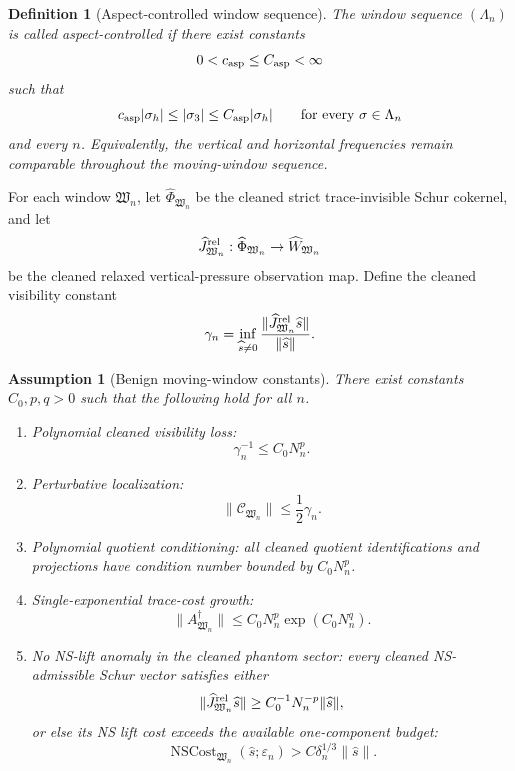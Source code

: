 \documentclass[11pt]{article}
\numberwithin{equation}{section}
\newtheorem{definition}[theorem]{Definition}
\newtheorem{assumption}[theorem]{Assumption}
\newcommand{\eps}{\varepsilon}
\begin{document}
\begin{definition}[Aspect-controlled window sequence]\label{def:aspect-controlled-window-sequence}
The window sequence \((\Lambda_n)\) is called aspect-controlled if there exist constants
\[
        0<c_{\rm asp}\le C_{\rm asp}<\infty
\]
such that
\[
        c_{\rm asp}|\sigma_h|
        \le
        |\sigma_3|
        \le
        C_{\rm asp}|\sigma_h|
        \qquad
        \text{for every }\sigma\in\Lambda_n
\]
and every \(n\).  Equivalently, the vertical and horizontal frequencies remain comparable throughout the moving-window sequence.
\end{definition}

For each window \(\mathfrak W_n\), let \(\widehat\Phi_{\mathfrak W_n}\) be the cleaned strict trace-invisible Schur cokernel, and let
\[
        \widehat J_{\mathfrak W_n}^{\rm rel}:
        \widehat\Phi_{\mathfrak W_n}\to \widehat W_{\mathfrak W_n}
\]
be the cleaned relaxed vertical-pressure observation map.  Define the cleaned visibility constant
\[
        \gamma_n
        =
        \inf_{\widehat s\neq0}
        \frac{\|\widehat J_{\mathfrak W_n}^{\rm rel}\widehat s\|}
        {\|\widehat s\|}.
\]

\begin{assumption}[Benign moving-window constants]\label{ass:benign-moving-window-constants}
There exist constants \(C_0,p,q>0\) such that the following hold for all \(n\).
\begin{enumerate}
\item \emph{Polynomial cleaned visibility loss:}
\[
        \gamma_n^{-1}\le C_0N_n^p.
\]
\item \emph{Perturbative localization:}
\[
        \|\mathcal C_{\mathfrak W_n}\|\le \frac12\gamma_n.
\]
\item \emph{Polynomial quotient conditioning:} all cleaned quotient identifications and projections have condition number bounded by \(C_0N_n^p\).
\item \emph{Single-exponential trace-cost growth:}
\[
        \|A_{\mathfrak W_n}^{\dagger}\|
        \le
        C_0N_n^p\exp(C_0N_n^q).
\]
\item \emph{No NS-lift anomaly in the cleaned phantom sector:} every cleaned NS-admissible Schur vector satisfies either
\[
        \|\widehat J_{\mathfrak W_n}^{\rm rel}\widehat s\|
        \ge
        C_0^{-1}N_n^{-p}\|\widehat s\|,
\]
or else its NS lift cost exceeds the available one-component budget:
\[
        \operatorname{NSCost}_{\mathfrak W_n}(\widehat s;\eps_n)
        >
        C\delta_n^{1/3}\|\widehat s\|.
\]
\end{enumerate}
\end{assumption}
\end{document}
